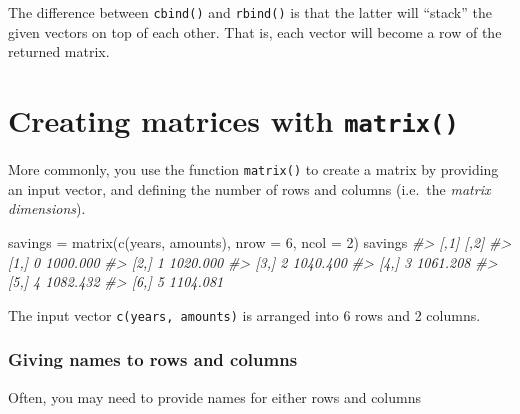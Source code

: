 \documentclass[
]{book}
\newenvironment{Shaded}{\begin{snugshade}}{\end{snugshade}}
\newcommand{\AttributeTok}[1]{\textcolor[rgb]{0.77,0.63,0.00}{#1}}
\newcommand{\CommentTok}[1]{\textcolor[rgb]{0.56,0.35,0.01}{\textit{#1}}}
\newcommand{\DecValTok}[1]{\textcolor[rgb]{0.00,0.00,0.81}{#1}}
\newcommand{\FunctionTok}[1]{\textcolor[rgb]{0.00,0.00,0.00}{#1}}
\newcommand{\NormalTok}[1]{#1}
\newcommand{\OtherTok}[1]{\textcolor[rgb]{0.56,0.35,0.01}{#1}}
\begin{document}
The difference between \texttt{cbind()} and \texttt{rbind()} is that the latter will ``stack''
the given vectors on top of each other. That is, each vector will become a row
of the returned matrix.

\hypertarget{creating-matrices-with-matrix}{%
\section{\texorpdfstring{Creating matrices with \texttt{matrix()}}{Creating matrices with matrix()}}\label{creating-matrices-with-matrix}}

More commonly, you use the function \texttt{matrix()} to create a matrix by providing
an input vector, and defining the number of rows and columns
(i.e.~the \emph{matrix dimensions}).

\begin{Shaded}
\begin{Highlighting}[]
\NormalTok{savings }\OtherTok{=} \FunctionTok{matrix}\NormalTok{(}\FunctionTok{c}\NormalTok{(years, amounts), }\AttributeTok{nrow =} \DecValTok{6}\NormalTok{, }\AttributeTok{ncol =} \DecValTok{2}\NormalTok{)}
\NormalTok{savings}
\CommentTok{\#\textgreater{}      [,1]     [,2]}
\CommentTok{\#\textgreater{} [1,]    0 1000.000}
\CommentTok{\#\textgreater{} [2,]    1 1020.000}
\CommentTok{\#\textgreater{} [3,]    2 1040.400}
\CommentTok{\#\textgreater{} [4,]    3 1061.208}
\CommentTok{\#\textgreater{} [5,]    4 1082.432}
\CommentTok{\#\textgreater{} [6,]    5 1104.081}
\end{Highlighting}
\end{Shaded}

The input vector \texttt{c(years,\ amounts)} is arranged into 6 rows and 2
columns.

\hypertarget{giving-names-to-rows-and-columns}{%
\subsubsection*{Giving names to rows and columns}\label{giving-names-to-rows-and-columns}}

Often, you may need to provide names for either rows and columns
\end{document}

